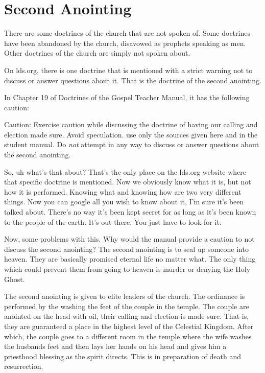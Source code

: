 \chapter{Second Anointing}

There are some doctrines of the church that are not spoken of. Some doctrines 
have been abandoned by the church, disavowed as prophets speaking as men. 
Other doctrines of the church are simply not spoken about.

On lds.org, there is one doctrine that is mentioned with a strict warning not to 
discuss or answer questions about it. That is the doctrine of the second 
anointing.

In Chapter 19 of Doctrines of the Gospel Teacher Manual, it has the following 
caution:

\begin{displayquote}
Caution: Exercise caution while discussing the doctrine of having our calling 
and election made sure. Avoid speculation. use only the sources given here and 
in the student manual. Do \textit{not} attempt in any way to discuss or answer 
questions about the second anointing.
\end{displayquote}

So, uh what's that about? That's the only place on the lds.org website where 
that specific doctrine is mentioned. Now we obviously know what it is, but not 
how it is performed. Knowing what and knowing how are two very different things. 
Now you can google all you wish to know about it, I'm sure it's been talked 
about. There's no way it's been kept secret for as long as it's been known to 
the people of the earth. It's out there. You just have to look for it.

 Now, some problems with this. Why would the manual provide a caution to not 
 discuss the second anointing? The second anointing is to seal up someone into 
 heaven. They are basically promised eternal life no matter what. The only thing 
 which could prevent them from going to heaven is murder or denying the Holy 
 Ghost.
 
 The second anointing is given to elite leaders of the church. The ordinance is 
 performed by the washing the feet of the couple in the temple. The couple are 
 anointed on the head with oil, their calling and election is made sure. That 
 is, they are guaranteed a place in the highest level of the Celestial Kingdom. 
 After which, the couple goes to a different room in the temple where the wife 
 washes the husbands feet and then lays her hands on his head and gives him a 
 priesthood blessing as the spirit directs. This is in preparation of death and 
 resurrection.
 

